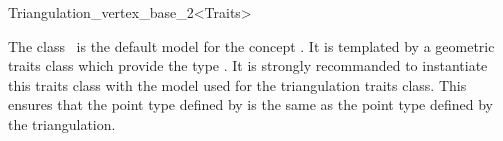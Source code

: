 

\begin{ccRefClass}{Triangulation_vertex_base_2<Traits>}  %


\ccDefinition
  
The class \ccRefName\ is the default model for the concept
.
It is  templated by a geometric traits class which provide the type
. It is strongly recommanded to instantiate this
traits class with the model used for the triangulation traits class.
This ensures that the point type defined by \ccRefName
is the same as the point type defined by 
the triangulation.


\ccIsModel
{}

\ccSeeAlso
{}


\end{ccRefClass}


